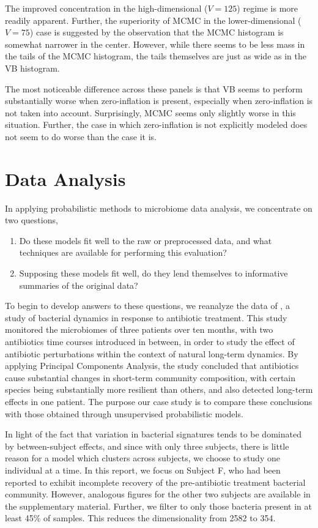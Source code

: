 \documentclass[oupdraft]{bio}
\begin{document}
The improved concentration in the high-dimensional ($V = 125$) regime is
more readily apparent. Further, the superiority of MCMC in the
lower-dimensional ($V = 75$) case is suggested by the observation that the MCMC
histogram is somewhat narrower in the center. However, while there seems to be
less mass in the tails of the MCMC histogram, the tails themselves are just as
wide as in the VB histogram.

The most noticeable difference across these panels is that VB
seems to perform substantially worse when zero-inflation is present, especially
when zero-inflation is not taken into account. Surprisingly, MCMC
seems only slightly worse in this situation. Further, the case in which
zero-inflation is not explicitly modeled does not seem to do worse than the case
it is.

\section{Data Analysis}

In applying probabilistic methods to microbiome data analysis, we concentrate on
two questions,
\begin{enumerate}
\item Do these models fit well to the raw or preprocessed data, and what techniques
are available for performing this evaluation?
\item Supposing these models fit well, do they lend themselves to informative
summaries of the original data?
\end{enumerate}

To begin to develop answers to these questions, we reanalyze the data of
\citep{dethlefsen2011incomplete}, a study of bacterial dynamics in response to
antibiotic treatment. This study monitored the microbiomes of three patients
over ten months, with two antibiotics time courses introduced in between, in
order to study the effect of antibiotic perturbations within the context of
natural long-term dynamics. By applying Principal Components Analysis, the study
concluded that antibiotics cause substantial changes in short-term community
composition, with certain species being substantially more resilient than
others, and also detected long-term effects in one patient. The purpose our case
study is to compare these conclusions with those obtained through unsupervised
probabilistic models.

In light of the fact that variation in bacterial signatures tends to be
dominated by between-subject effects, and since with only three subjects, there
is little reason for a model which clusters across subjects, we choose to study
one individual at a time. In this report, we focus on Subject F, who had been
reported to exhibit incomplete recovery of the pre-antibiotic treatment
bacterial community. However, analogous figures for the other two subjects are
available in the supplementary material. Further, we filter to only those
bacteria present in at least 45\% of samples. This reduces the dimensionality
from 2582 to 354.
\end{document}
